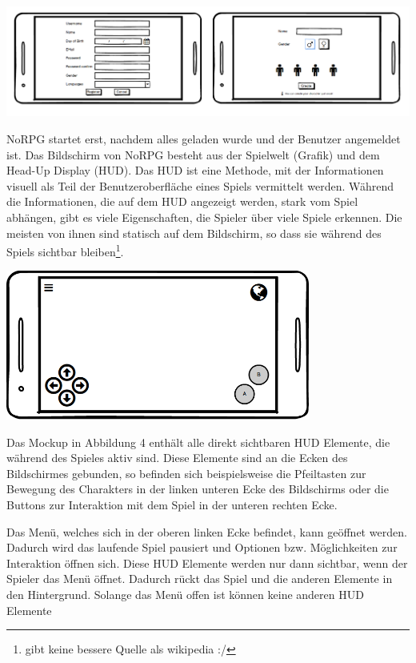 			\begin{center}
				\includegraphics[width=\textwidth]{pics/Registerprozess.png}
			\end{center}

			NoRPG startet erst, nachdem alles geladen wurde und der Benutzer angemeldet ist. Das Bildschirm von NoRPG besteht aus der Spielwelt (Grafik) und dem Head-Up Display (HUD). Das HUD ist eine Methode, mit der Informationen visuell als Teil der Benutzeroberfläche eines Spiels vermittelt werden. Während die Informationen, die auf dem HUD angezeigt werden, stark vom Spiel abhängen, gibt es viele Eigenschaften, die Spieler über viele Spiele erkennen. Die meisten von ihnen sind statisch auf dem Bildschirm, so dass sie während des Spiels sichtbar bleiben\footnote{gibt keine bessere Quelle als wikipedia :/}.  
			
			\begin{center}
				\includegraphics[width=10cm]{pics/HUD.png}
			\end{center}
			
			Das Mockup in Abbildung 4 enthält alle direkt sichtbaren HUD Elemente, die während des Spieles aktiv sind. Diese Elemente sind an die Ecken des Bildschirmes gebunden, so befinden sich beispielsweise die Pfeiltasten zur Bewegung des Charakters in der linken unteren Ecke des Bildschirms oder die Buttons zur Interaktion mit dem Spiel in der unteren rechten Ecke. 
			
			Das Menü, welches sich in der oberen linken Ecke befindet, kann geöffnet werden. Dadurch wird das laufende Spiel pausiert und Optionen bzw. Möglichkeiten zur Interaktion öffnen sich. Diese HUD Elemente werden nur dann sichtbar, wenn der Spieler das Menü öffnet. Dadurch rückt das Spiel und die anderen Elemente in den Hintergrund. Solange das Menü offen ist können keine anderen HUD Elemente
			

